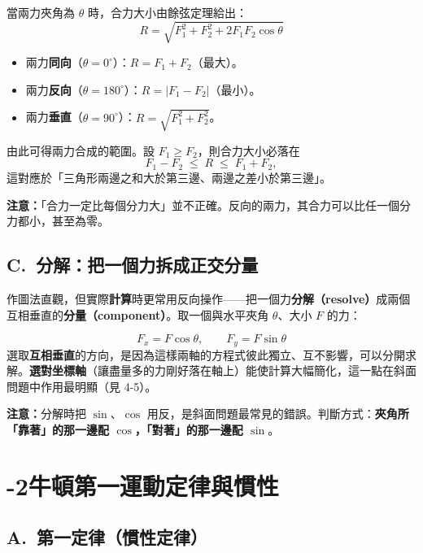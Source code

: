 \documentclass[11pt]{article}
\begin{document}

當兩力夾角為 $\theta$ 時，合力大小由餘弦定理給出：
$$\boxed{\;R = \sqrt{F_1^2 + F_2^2 + 2F_1F_2\cos\theta}\;}$$
\begin{itemize}\setlength{\itemsep}{1pt}
\item 兩力\textbf{同向}（$\theta=0^\circ$）：$R=F_1+F_2$（最大）。
\item 兩力\textbf{反向}（$\theta=180^\circ$）：$R=|F_1-F_2|$（最小）。
\item 兩力\textbf{垂直}（$\theta=90^\circ$）：$R=\sqrt{F_1^2+F_2^2}$。
\end{itemize}

由此可得兩力合成的範圍。設 $F_1\ge F_2$，則合力大小必落在
$$F_1 - F_2 \;\le\; R \;\le\; F_1 + F_2,$$
這對應於「三角形兩邊之和大於第三邊、兩邊之差小於第三邊」。

\textbf{注意：}「合力一定比每個分力大」並不正確。反向的兩力，其合力可以比任一個分力都小，甚至為零。

\subsection*{\sffamily C.\ 分解：把一個力拆成正交分量}

作圖法直觀，但實際\textbf{計算}時更常用反向操作——把一個力\textbf{分解（resolve）}成兩個互相垂直的\textbf{分量（component）}。取一個與水平夾角 $\theta$、大小 $F$ 的力：


$$\boxed{\;F_x = F\cos\theta,\qquad F_y = F\sin\theta\;}$$
選取\textbf{互相垂直}的方向，是因為這樣兩軸的方程式彼此獨立、互不影響，可以分開求解。\textbf{選對坐標軸}（讓盡量多的力剛好落在軸上）能使計算大幅簡化，這一點在斜面問題中作用最明顯（見 4-5）。

\textbf{注意：}分解時把 $\sin$、$\cos$ 用反，是斜面問題最常見的錯誤。判斷方式：\textbf{夾角所「靠著」的那一邊配 $\cos$，「對著」的那一邊配 $\sin$}。

\section*{-2\quad 牛頓第一運動定律與慣性}

\subsection*{\sffamily A.\ 第一定律（慣性定律）}
\end{document}
